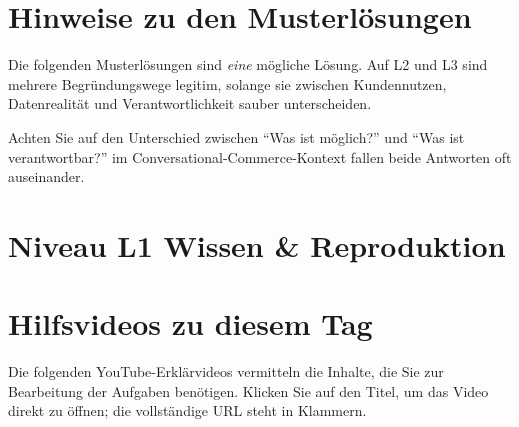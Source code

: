 \documentclass[11pt,a4paper,oneside]{article}
\begin{document}
\section*{Hinweise zu den Musterlösungen}
\thispagestyle{plain}

\noindent Die folgenden Musterlösungen sind \emph{eine} mögliche Lösung. Auf L2 und L3 sind mehrere Begründungswege legitim, solange sie zwischen Kundennutzen, Datenrealität und Verantwortlichkeit sauber unterscheiden.

\begin{infobox}
Achten Sie auf den Unterschied zwischen ``Was ist möglich?'' und ``Was ist verantwortbar?'' \textendash{} im Conversational-Commerce-Kontext fallen beide Antworten oft auseinander.
\end{infobox}

\clearpage

\section*{Niveau L1 \textendash{} Wissen \& Reproduktion}

\section*{Hilfsvideos zu diesem Tag}
\thispagestyle{plain}

\noindent Die folgenden YouTube-Erkl\"arvideos vermitteln die Inhalte, die Sie zur Bearbeitung der Aufgaben ben\"otigen. Klicken Sie auf den Titel, um das Video direkt zu \"offnen; die vollst\"andige URL steht in Klammern.
\end{document}
